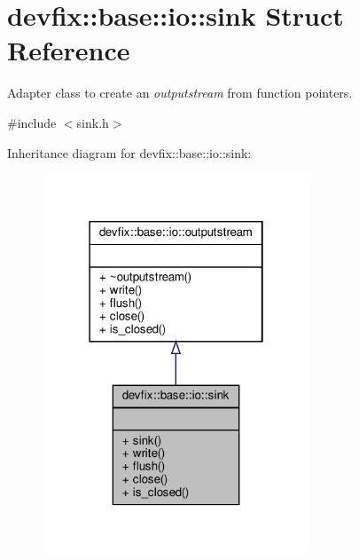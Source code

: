 \hypertarget{structdevfix_1_1base_1_1io_1_1sink}{}\section{devfix\+:\+:base\+:\+:io\+:\+:sink Struct Reference}
\label{structdevfix_1_1base_1_1io_1_1sink}


Adapter class to create an {\itshape outputstream} from function pointers.  




{\ttfamily \#include $<$sink.\+h$>$}



Inheritance diagram for devfix\+:\+:base\+:\+:io\+:\+:sink\+:\nopagebreak
\begin{figure}[H]
\begin{center}
\leavevmode
\includegraphics[width=226pt]{structdevfix_1_1base_1_1io_1_1sink__inherit__graph}
\end{center}
\end{figure}
